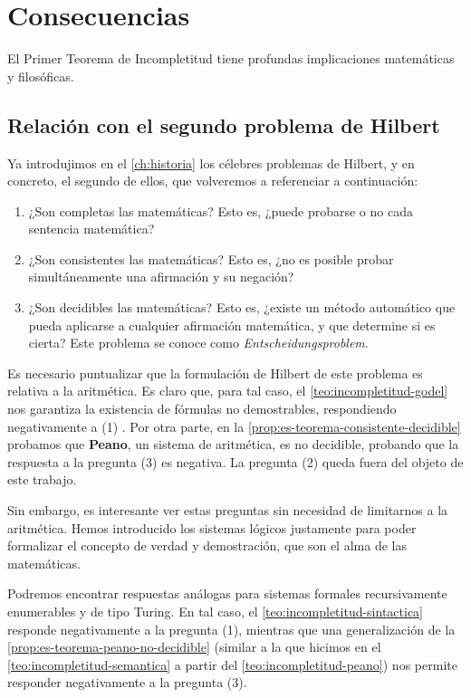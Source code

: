 \section{Consecuencias}\label{sec:consecuencias}

El Primer Teorema de Incompletitud tiene profundas implicaciones matemáticas y filosóficas.

\subsection{Relación con el segundo problema de Hilbert}\label{subsec:segundo-problema-hilbert}

Ya introdujimos en el \cref{ch:historia} los célebres problemas de Hilbert, y en concreto, el segundo de ellos, que volveremos a referenciar a continuación:

\begin{enumerate}[label=(\arabic*)]
    \item ¿Son completas las matemáticas? Esto es, ¿puede probarse o no cada sentencia matemática?
    \item ¿Son consistentes las matemáticas? Esto es, ¿no es posible probar simultáneamente una afirmación y su negación?
    \item ¿Son decidibles las matemáticas? Esto es, ¿existe un método automático que pueda aplicarse a cualquier afirmación matemática, y que determine si es cierta? Este problema se conoce como \emph{Entscheidungsproblem}.
\end{enumerate}

Es necesario puntualizar que la formulación de Hilbert de este problema es relativa a la aritmética. Es claro que, para tal caso, el \cref{teo:incompletitud-godel} nos garantiza la existencia de fórmulas no demostrables, respondiendo negativamente a (1) \cite{Hellman1981}. Por otra parte, en la \cref{prop:es-teorema-consistente-decidible} probamos que \textbf{Peano}, un sistema de aritmética, es no decidible, probando que la respuesta a la pregunta (3) es negativa. La pregunta (2) queda fuera del objeto de este trabajo.

Sin embargo, es interesante ver estas preguntas sin necesidad de limitarnos a la aritmética. Hemos introducido los sistemas lógicos justamente para poder formalizar el concepto de verdad y demostración, que son el alma de las matemáticas.

Podremos encontrar respuestas análogas para sistemas formales recursivamente enumerables y de tipo Turing. En tal caso, el \cref{teo:incompletitud-sintactica} responde negativamente a la pregunta (1), mientras que una generalización de la \cref{prop:es-teorema-peano-no-decidible} (similar a la que hicimos en el \cref{teo:incompletitud-semantica} a partir del \cref{teo:incompletitud-peano}) nos permite responder negativamente a la pregunta (3).

